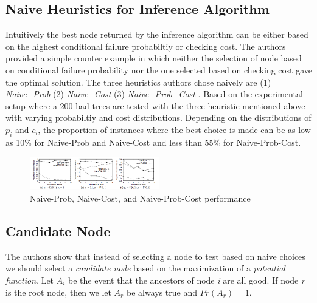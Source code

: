 \documentclass[10pt]{sigplan-proc-varsize}
\begin{document}
\subsection{Naive Heuristics for Inference Algorithm}
Intuitively the best node returned by the inference algorithm can be either based on the highest conditional failure probabiltiy or checking cost.  The authors provided a simple counter example in which neither the selection of node based on conditional failure probability nor the one selected based on checking cost gave the optimal solution. The three heuristics authors chose naively are (1) {\it Naive_Prob} (2) {\it Naive_Cost} (3) {\it Naive_Prob_Cost} . Based on the experimental setup where a 200 bad trees are tested with the three heuristic mentioned above with varying probabiltiy and cost distributions. Depending on the distributions of $p_i$ and $c_i$, the proportion of instances where the best choice is made can be as low as 10\% for Naive-Prob and Naive-Cost  and less than 55\% for Naive-Prob-Cost.
\begin{figure}[h!]
  \caption{Naive-Prob, Naive-Cost, and Naive-Prob-Cost performance}
  \centering
    \includegraphics[width=0.5\textwidth]{Fig11}
\end{figure}

\subsection{Candidate Node}
The authors show that instead of selecting a node to test based on naive choices we should select a {\it candidate node} based on the maximization of a {\it potential function}. Let $A_i$ be the event that the ancestors of node {\it i} are all good. If node {\it r} is the root node, then we let $A_r$ be always true and $Pr(A_r) = 1$.
\appendix
%
%


\end{document}
